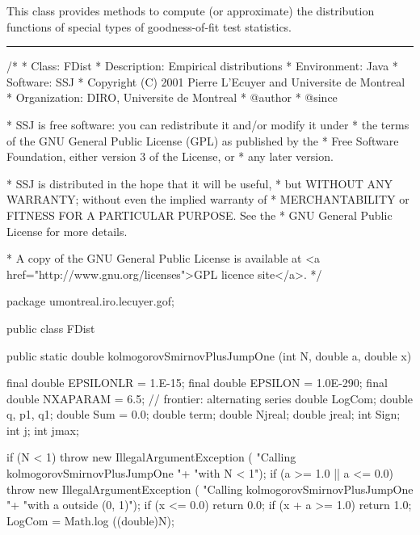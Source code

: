 
This class provides methods to compute (or approximate)
the distribution functions of special types of
goodness-of-fit test statistics.

\bigskip\hrule

\begin{code}
\begin{hide}
/*
 * Class:        FDist
 * Description:  Empirical distributions
 * Environment:  Java
 * Software:     SSJ 
 * Copyright (C) 2001  Pierre L'Ecuyer and Universite de Montreal
 * Organization: DIRO, Universite de Montreal
 * @author       
 * @since

 * SSJ is free software: you can redistribute it and/or modify it under
 * the terms of the GNU General Public License (GPL) as published by the
 * Free Software Foundation, either version 3 of the License, or
 * any later version.

 * SSJ is distributed in the hope that it will be useful,
 * but WITHOUT ANY WARRANTY; without even the implied warranty of
 * MERCHANTABILITY or FITNESS FOR A PARTICULAR PURPOSE.  See the
 * GNU General Public License for more details.

 * A copy of the GNU General Public License is available at
   <a href="http://www.gnu.org/licenses">GPL licence site</a>.
 */
\end{hide}
package umontreal.iro.lecuyer.gof;


public class FDist\begin{hide} {
   private FDist() {}
\end{hide}

   public static double kolmogorovSmirnovPlusJumpOne (int N, double a,
                                                      double x)\begin{hide} {
      final double EPSILONLR = 1.E-15;
      final double EPSILON = 1.0E-290;
      final double NXAPARAM = 6.5;   // frontier: alternating series
      double LogCom;
      double q, p1, q1;
      double Sum = 0.0;
      double term;
      double Njreal;
      double jreal;
      int Sign;
      int j;
      int jmax;

      if (N < 1)
        throw new IllegalArgumentException (
                             "Calling kolmogorovSmirnovPlusJumpOne "+
                             "with N < 1");
      if (a >= 1.0 || a <= 0.0)
        throw new IllegalArgumentException (
                             "Calling kolmogorovSmirnovPlusJumpOne "+
                             "with a outside (0, 1)");
      if (x <= 0.0)
         return 0.0;
      if (x + a >= 1.0)
         return 1.0;
      LogCom = Math.log ((double)N);

}
\end{hide}
\end{code}

